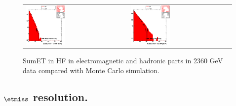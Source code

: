 \begin{figure}[h!]
 \centering
 \begin{tabular}{ll}
  \includegraphics[width=0.40\textwidth]{plots_DataVsMC_MB_2360GeV/h_caloSumetEmHF.eps} &
  \includegraphics[width=0.40\textwidth]{plots_DataVsMC_MB_2360GeV/h_caloSumetHadHF.eps} \\
 \end{tabular}
 \caption{SumET in HF in electromagnetic and hadronic parts in 2360 GeV data compared
   with Monte Carlo simulation.
          \label{fig:DataVsMC_MB_2360_6}}
\end{figure}

\clearpage

\subsection{$\etmiss$ resolution.}

